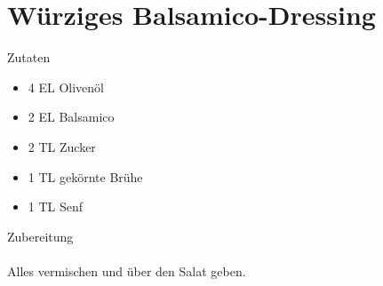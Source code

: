 \section*{Würziges Balsamico-Dressing}
\ihead{}\ohead{}
\cfoot{}
{\Large Zutaten}
\begin{multicols}{2}
\begin{itemize}
    \item \num{4} EL Olivenöl
    \item \num{2} EL Balsamico
    \item \num{2} TL Zucker
    \item \num{1} TL gekörnte Brühe
    \item \num{1} TL Senf
\end{itemize}
\end{multicols}
\noindent
{\Large Zubereitung}\\
\\
Alles vermischen und über den Salat geben.